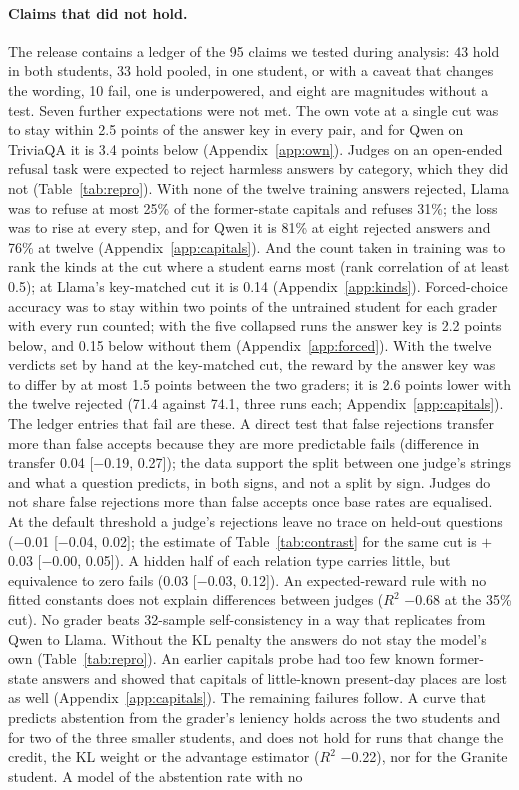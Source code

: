 \paragraph{Claims that did not hold.} The release contains a ledger of the 95 claims we tested during analysis: 43 hold in both students, 33 hold pooled, in one student, or with a caveat that changes the wording, 10 fail, one is underpowered, and eight are magnitudes without a test. Seven further expectations were not met. The own vote at a single cut was to stay within 2.5 points of the answer key in every pair, and for Qwen on TriviaQA it is 3.4 points below (Appendix~\ref{app:own}). Judges on an open-ended refusal task were expected to reject harmless answers by category, which they did not (Table~\ref{tab:repro}). With none of the twelve training answers rejected, Llama was to refuse at most 25\% of the former-state capitals and refuses 31\%; the loss was to rise at every step, and for Qwen it is 81\% at eight rejected answers and 76\% at twelve (Appendix~\ref{app:capitals}). And the count taken in training was to rank the kinds at the cut where a student earns most (rank correlation of at least 0.5); at Llama's key-matched cut it is 0.14 (Appendix~\ref{app:kinds}). Forced-choice accuracy was to stay within two points of the untrained student for each grader with every run counted; with the five collapsed runs the answer key is 2.2 points below, and 0.15 below without them (Appendix~\ref{app:forced}). With the twelve verdicts set by hand at the key-matched cut, the reward by the answer key was to differ by at most 1.5 points between the two graders; it is 2.6 points lower with the twelve rejected (71.4 against 74.1, three runs each; Appendix~\ref{app:capitals}). The ledger entries that fail are these. A direct test that false rejections transfer more than false accepts because they are more predictable fails (difference in transfer 0.04 [$-$0.19, 0.27]); the data support the split between one judge's strings and what a question predicts, in both signs, and not a split by sign. Judges do not share false rejections more than false accepts once base rates are equalised. At the default threshold a judge's rejections leave no trace on held-out questions ($-$0.01 [$-$0.04, 0.02]; the estimate of Table~\ref{tab:contrast} for the same cut is $+$0.03 [$-$0.00, 0.05]). A hidden half of each relation type carries little, but equivalence to zero fails (0.03 [$-$0.03, 0.12]). An expected-reward rule with no fitted constants does not explain differences between judges ($R^2$ $-$0.68 at the 35\% cut). No grader beats 32-sample self-consistency in a way that replicates from Qwen to Llama. Without the KL penalty the answers do not stay the model's own (Table~\ref{tab:repro}). An earlier capitals probe had too few known former-state answers and showed that capitals of little-known present-day places are lost as well (Appendix~\ref{app:capitals}). The remaining failures follow. A curve that predicts abstention from the grader's leniency holds across the two students and for two of the three smaller students, and does not hold for runs that change the credit, the KL weight or the advantage estimator ($R^2$ $-$0.22), nor for the Granite student. A model of the abstention rate with no 